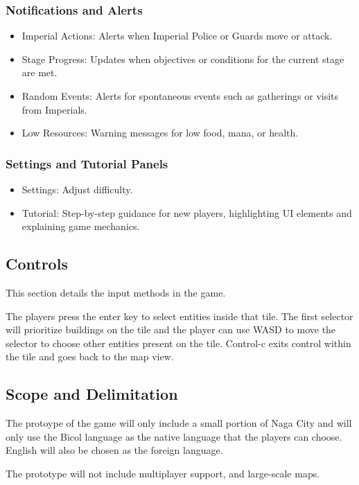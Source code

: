 \documentclass[11pt]{article}
\begin{document}
\subsubsection{Notifications and Alerts}
\begin{itemize}
\item Imperial Actions: Alerts when Imperial Police or Guards move or attack.
\item Stage Progress: Updates when objectives or conditions for the current stage are met.
\item Random Events: Alerts for spontaneous events such as gatherings or visits from Imperials.
\item Low Resources: Warning messages for low food, mana, or health.
\end{itemize}

\subsubsection{Settings and Tutorial Panels}
\begin{itemize}
\item Settings: Adjust difficulty.
\item Tutorial: Step-by-step guidance for new players, highlighting UI elements and explaining game mechanics.
\end{itemize}

\subsection{Controls}
This section details the input methods in the game.

The players press the enter key to select entities inside that tile. The first selector will prioritize buildings on the tile and the player can use WASD to move the selector to choose other entities present on the tile. Control-c exits control within the tile and goes back to the map view.

\subsection{Scope and Delimitation}
The protoype of the game will only include a small portion of Naga City and will only use the Bicol language as the native language that the players can choose. English will also be chosen as the foreign language.

The prototype will not include multiplayer support, and large-scale maps.
\end{document}
